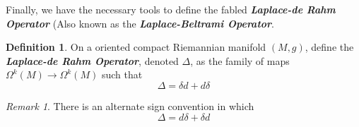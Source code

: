 \documentclass[psamsfonts]{amsart}
\theoremstyle{definition}
\newtheorem{defn}[thm]{Definition}
\theoremstyle{remark}
\newtheorem*{rem*}{Remark}
\newcommand{\ib}[1]{\textbf{\textit{#1}}}
\begin{document}
Finally,  we have the necessary tools to define the fabled \ib{Laplace-de Rahm Operator} (Also known as the  \ib{Laplace-Beltrami Operator}.
\begin{defn}
On a oriented compact Riemannian manifold $(M,g)$, define the \ib{Laplace-de Rahm Operator}, denoted $\Delta$, as  the family of maps $\Omega^k(M) \to \Omega^k(M)$ such that 
$$\Delta = \delta d + d\delta $$
\begin{rem*}
There is an alternate sign convention in which
$$\Delta = d\delta + \delta d $$
\end{rem*}
\end{defn}

%
\end{document}
